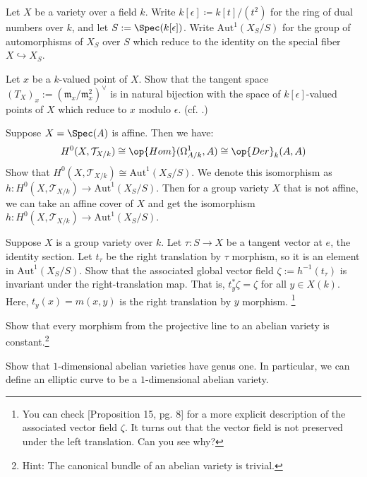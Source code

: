 \documentclass[../notes.tex]{subfiles}
\begin{document}
\begin{prob}
	Let $X$ be a variety over a field $k$. Write $k[\epsilon] \coloneqq k[t]/(t^2)$ for the ring of dual numbers over $k$, and let $S := \Spec(k[\epsilon])$. Write $\text{Aut}^{1} (X_S/S)$ for the group of automorphisms of $X_S$ over $S$ which reduce to the identity on the special fiber $X \hookrightarrow X_S$.
    \begin{listalph}
        \item Let $x$ be a $k$-valued point of $X$. Show that the tangent space $(T_X)_x := (\mathfrak{m}_x/\mathfrak{m}_x^2)^\vee
        $ is in natural bijection with the space of $k[\epsilon]$-valued points of $X$ which reduce to $x$ modulo $\epsilon$. (cf. \cite[Chapter II, Exercise 2.8]{Hartshorne1977}.)
        \item Suppose $X=\Spec(A)$ is affine. Then we have:
        \begin{equation*}
            H^0(X, \mathcal{T}_{X/k}) \cong \op{Hom}(\Omega_{A/k}^1, A) \cong \op{Der}_k(A,A)
        \end{equation*}
        Show that $H^0(X, \mathcal{T}_{X/k}) \cong \text{Aut}^{1} (X_S/S)$. We denote this isomorphism as $h: H^0(X, \mathcal{T}_{X/k}) \to \text{Aut}^{1} (X_S/S)$. Then for a group variety $X$ that is not affine, we can take an affine cover of $X$ and get the isomorphism $h:H^0(X, \mathcal{T}_{X/k}) \to \text{Aut}^{1} (X_S/S)$.
        \item Suppose $X$ is a group variety over $k$. Let $\tau: S \to X$ be a tangent vector at $e$, the identity section. Let $t_\tau$ be the right translation by $\tau$ morphism, so it is an element in $\text{Aut}^{1}(X_S/S)$. Show that the associated global vector field $\zeta := h^{-1}(t_\tau)$ is invariant under the right-translation map. That is, $t_y^{*}\zeta=\zeta$ for all $y \in X(k)$. Here, $t_y(x)=m(x,y)$ is the right translation by $y$ morphism. \footnote{You can check \cite{EVdGM2012}[Proposition 15, pg. 8] for a more explicit description of the associated vector field $\zeta$. It turns out that the vector field is not preserved under the left translation. Can you see why?}
    \end{listalph}
\end{prob}

\begin{prob}
	Show that every morphism from the projective line to an abelian variety is constant.\footnote{Hint: The canonical bundle of an abelian variety is trivial.}
\end{prob}

\begin{prob}
	Show that $1$-dimensional abelian varieties have genus one. In particular, we can define an elliptic curve to be a $1$-dimensional abelian variety.
\end{prob}
\end{document}
